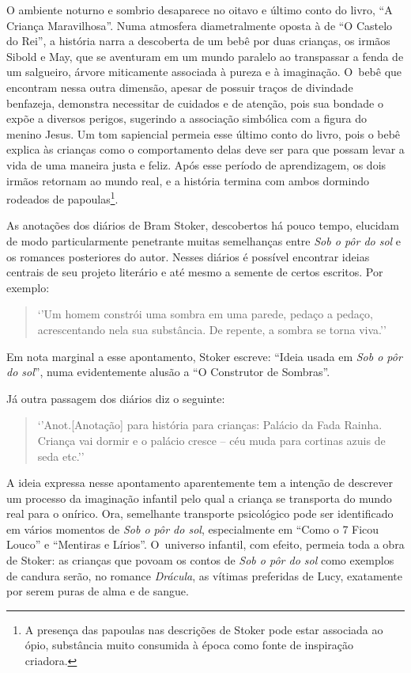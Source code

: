 O ambiente noturno e sombrio desaparece no oitavo e último conto do
livro, ``A Criança Maravilhosa''. Numa atmosfera diametralmente oposta à
de ``O Castelo do Rei'', a história narra a descoberta de um bebê por
duas crianças, os irmãos Sibold e May, que se aventuram em um mundo
paralelo ao transpassar a fenda de um salgueiro, árvore miticamente
associada à pureza e à imaginação. O~bebê que encontram nessa outra
dimensão, apesar de possuir traços de divindade benfazeja, demonstra
necessitar de cuidados e de atenção, pois sua bondade o expõe a diversos
perigos, sugerindo a associação simbólica com a figura do menino Jesus.
Um tom sapiencial permeia esse último conto do livro, pois o bebê
explica às crianças como o comportamento delas deve ser para que possam
levar a vida de uma maneira justa e feliz. Após esse período de
aprendizagem, os dois irmãos retornam ao mundo real, e a história
termina com ambos dormindo rodeados de
papoulas\footnote{A presença das papoulas nas descrições de
Stoker pode estar associada ao ópio, substância muito consumida à época
como fonte de inspiração criadora.}.

\asterisc{}


As anotações dos diários de Bram Stoker, descobertos há pouco tempo,
elucidam de modo particularmente penetrante muitas semelhanças entre \emph{Sob
o pôr do sol} e os romances posteriores do autor. Nesses diários é
possível encontrar ideias centrais de seu projeto literário e até mesmo
a semente de certos escritos. Por exemplo:

 

\begin{quote}
`'Um homem constrói uma sombra em uma parede, pedaço a pedaço,
acrescentando nela sua substância. De repente, a sombra se torna viva.''

 

\end{quote}
Em nota marginal a esse apontamento, Stoker escreve: ``Ideia usada em
\emph{Sob o pôr do sol}'', numa evidentemente alusão a ``O Construtor de
Sombras''.

Já outra passagem dos diários diz o seguinte:

 

\begin{quote}
`'Anot.{[}Anotação{]} para história para crianças: Palácio da Fada Rainha.
Criança vai dormir e o palácio cresce -- céu muda para cortinas azuis de
seda etc.''

 

\end{quote}
A ideia expressa nesse apontamento aparentemente tem a intenção de
descrever um processo da imaginação infantil pelo qual a criança se
transporta do mundo real para o onírico. Ora, semelhante transporte
psicológico pode ser identificado em vários momentos de \emph{Sob o pôr do
sol}, especialmente em ``Como o 7 Ficou Louco'' e ``Mentiras e Lírios''.
O~universo infantil, com efeito, permeia toda a obra de Stoker: as
crianças que povoam os contos de \emph{Sob o pôr do sol} como exemplos de
candura serão, no romance \emph{Drácula}, as vítimas preferidas de Lucy,
exatamente por serem puras de alma e de sangue.

